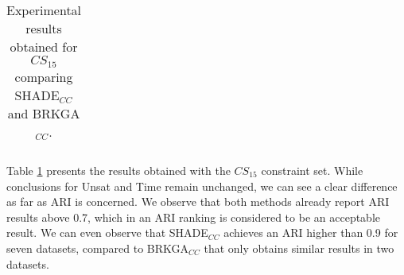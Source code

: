\begin{table}[!h]
{\begin{tabular}{l ccc c ccc}
	\end{tabular}}
	
	\caption{Experimental results obtained for $CS_{15}$ comparing \acs{SHADE}$_{CC}$ and \acs{BRKGA}$_{CC}$.}
	\label{tab:resultsBRKGAvsSHADE15}
\end{table}

Table \ref{tab:resultsBRKGAvsSHADE15} presents the results obtained with the $CS_{15}$ constraint set. While conclusions for Unsat and Time remain unchanged, we can see a clear difference as far as \acs{ARI} is concerned. We observe that both methods already report \acs{ARI} results above 0.7, which in an \acs{ARI} ranking is considered to be an acceptable result. We can even observe that \acs{SHADE}$_{CC}$ achieves an \acs{ARI} higher than 0.9 for seven datasets, compared to \acs{BRKGA}$_{CC}$ that only obtains similar results in two datasets.

